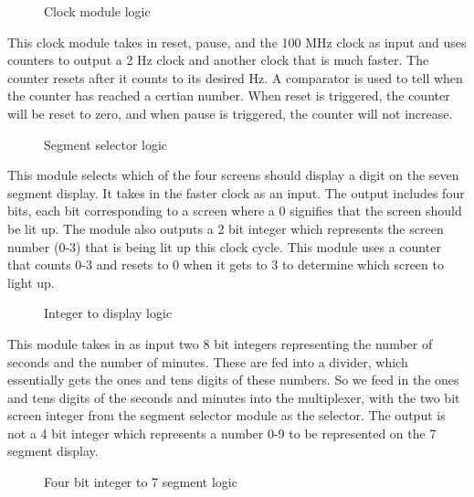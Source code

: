 \documentclass{article}
\begin{document}
\begin{figure}[H]
	\begin{center}
		\caption{Clock module logic}
	\end{center}
\end{figure}

This clock module takes in reset, pause, and the 100 MHz clock as input and uses counters to output a 2 Hz clock and another clock that is much faster. The counter resets after it counts to its desired Hz. A comparator is used to tell when the counter has reached a certian number. When reset is triggered, the counter will be reset to zero, and when pause is triggered, the counter will not increase.

\begin{figure}[H]
	\begin{center}
		\caption{Segment selector logic}
	\end{center}
\end{figure}

This module selects which of the four screens should display a digit on the seven segment display. It takes in the faster clock as an input. The output includes four bits, each bit corresponding to a screen where a 0 signifies that the screen should be lit up. The module also outputs a 2 bit integer which represents the screen number (0-3) that is being lit up this clock cycle. This module uses a counter that counts 0-3 and resets to 0 when it gets to 3 to determine which screen to light up.

\begin{figure}[H]
	\begin{center}
		\caption{Integer to display logic}
	\end{center}
\end{figure}

This module takes in as input two 8 bit integers representing the number of seconds and the number of minutes. These are fed into a divider, which essentially gets the ones and tens digits of these numbers. So we feed in the ones and tens digits of the seconds and minutes into the multiplexer, with the two bit screen integer from the segment selector module as the selector. The output is not a 4 bit integer which represents a number 0-9 to be represented on the 7 segment display. 

\begin{figure}[H]
	\begin{center}
		\caption{Four bit integer to 7 segment logic}
	\end{center}
\end{figure}
\end{document}
